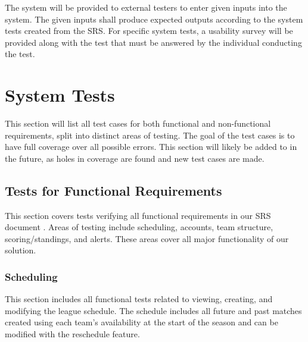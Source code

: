 \documentclass[12pt, titlepage]{article}
\begin{document}

The system will be provided to external testers to enter given inputs into the system. 
The given inputs shall produce expected outputs according to the system tests created 
from the SRS. For specific system tests, a usability survey will be provided along 
with the test that must be answered by the individual conducting the test.

\section{System Tests}

This section will list all test cases for both functional and non-functional
requirements, split into distinct areas of testing. The goal of the test cases
is to have full coverage over all possible errors. This section will likely be
added to in the future, as holes in coverage are found and new test cases are
made.

\subsection{Tests for Functional Requirements}

This section covers tests verifying all functional requirements in our SRS
document \cite{SRS}. Areas of testing include scheduling, accounts, team
structure, scoring/standings, and alerts. These areas cover all major
functionality of our solution.

\subsubsection{Scheduling}

This section includes all functional tests related to viewing, creating, and
modifying the league schedule. The schedule includes all future and past
matches created using each team's availability at the start of the season and
can be modified with the reschedule feature.
\end{document}
